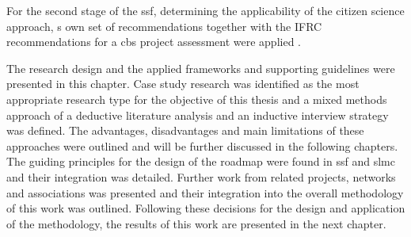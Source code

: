For the second stage of the \acrshort*{ssf}, determining the applicability of the citizen science approach, \autocite{fraislCitizenScienceEnvironmental2022}s own set of recommendations together with the IFRC recommendations for a \acrshort*{cbs} project assessment were applied \autocite{goodermoteConductingAssessmentCommunitybased2020}.


The research design and the applied frameworks and supporting guidelines were presented in this chapter. Case study research was identified as the most appropriate research type for the objective of this thesis and a mixed methods approach of a deductive literature analysis and an inductive interview strategy was defined. The advantages, disadvantages and main limitations of these approaches were outlined and will be further discussed in the following chapters. The guiding principles for the design of the roadmap were found in \acrlong*{ssf} and \acrlong*{slmc} and their integration was detailed. Further work from related projects, networks and associations was presented and their integration into the overall methodology of this work was outlined. Following these decisions for the design and application of the methodology, the results of this work are presented in the next chapter.




